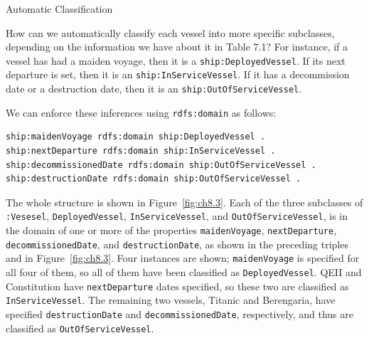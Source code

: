 \begin{challenge}{Automatic Classification}
\label{chal:10}

How can we automatically classify each vessel into more specific
subclasses, depending on the information we have about it in Table 7.1?
For instance, if a vessel has had a maiden voyage, then it is a
\texttt{ship:DeployedVessel}. If its next departure is set, then it is an
\texttt{ship:InServiceVessel}. If it has a decommission date or a destruction
date, then it is an \texttt{ship:OutOfServiceVessel}.

\solution

We can enforce these inferences using \texttt{rdfs:domain} as follows:

\begin{lstlisting}
ship:maidenVoyage rdfs:domain ship:DeployedVessel .
ship:nextDeparture rdfs:domain ship:InServiceVessel .
ship:decommissionedDate rdfs:domain ship:OutOfServiceVessel .
ship:destructionDate rdfs:domain ship:OutOfServiceVessel .
\end{lstlisting}

The whole structure is shown in Figure~\ref{fig:ch8.3}. Each of the three subclasses of \texttt{:Vesesel}, 
\texttt{DeployedVessel}, \texttt{InServiceVessel}, and \texttt{OutOfServiceVessel},
is in the domain of one or more of the properties \texttt{maidenVoyage},
\texttt{nextDeparture}, \texttt{decommissionedDate}, and \texttt{destructionDate}, as shown in the
preceding triples and in Figure~\ref{fig:ch8.3}. Four instances are shown;
\texttt{maidenVoyage} is specified for all four of them, so all of them have been
classified as \texttt{DeployedVessel}. QEII and Constitution have \texttt{nextDeparture}
dates specified, so these two are classified as \texttt{InServiceVessel}. The
remaining two vessels, Titanic and Berengaria, have specified
\texttt{destructionDate} and \texttt{decommissionedDate}, respectively, and thus are
classified as \texttt{OutOfServiceVessel}.
\end{challenge}

